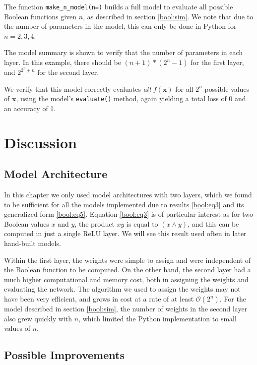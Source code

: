 \documentclass{somasmsc}
\begin{document}
\begin{exa}
The function \verb|make_n_model(n=)| builds a full model to evaluate all possible Boolean functions given $n$, as described in section \ref{bool:sim}. We note that due to the number of parameters in the model, this can only be done in Python for $n=2,3,4$.

The model summary is shown to verify that the number of parameters in each layer. In this example, there should be $\left(n+1\right)*\left(2^n-1\right)$ for the first layer, and $2^{2^n+n}$ for the second layer.

We verify that this model correctly evaluates \textit{all} $f(\pmb{x})$ for all $2^n$ possible values of $\pmb{x}$, using the model's \verb|evaluate()| method, again yielding a total loss of 0 and an accuracy of 1.
\end{exa}

\section{Discussion}

\subsection{Model Architecture}

In this chapter we only used model architectures with two layers, which we found to be sufficient for all the models implemented due to results \ref{bool:eq3} and its generalized form \ref{bool:eq5}. Equation \ref{bool:eq3} is of particular interest as for two Boolean values $x$ and $y$, the product $xy$ is equal to $\left(x \land y\right)$, and this can be computed in just a single ReLU layer. We will see this result used often in later hand-built models.

Within the first layer, the weights were simple to assign and were independent of the Boolean function to be computed. On the other hand, the second layer had a much higher computational and memory cost, both in assigning the weights and evaluating the network. The algorithm we used to assign the weights may not have been very efficient, and grows in cost at a rate of at least $\mathcal{O}\left(2^n\right)$. For the model described in section \ref{bool:sim}, the number of weights in the second layer also grew quickly with $n$, which limited the Python implementation to small values of $n$.

\subsection{Possible Improvements}
\end{document}
